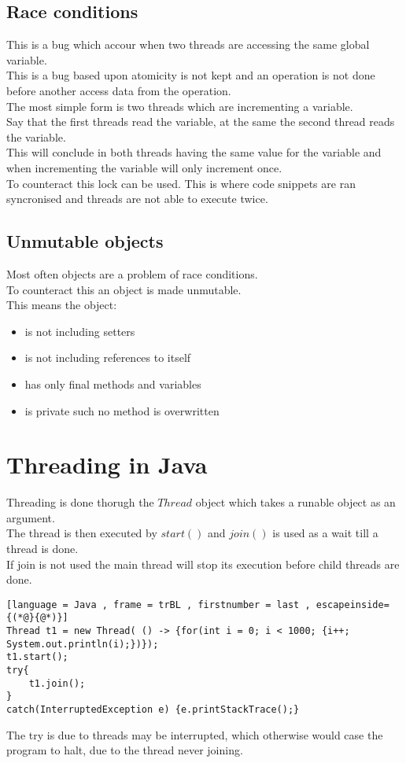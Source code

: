 \documentclass[12pt, a4paper]{article}
\begin{document}
	\subsection{Race conditions}
		This is a bug which accour when two threads are accessing the same global variable.\\
		This is a bug based upon atomicity is not kept and an operation is not done before another access data from the operation.\\
		The most simple form is two threads which are incrementing a variable.\\
		Say that the first threads read the variable, at the same the second thread reads the variable.\\
		This will conclude in both threads having the same value for the variable and when incrementing the variable will only increment once.\\
		To counteract this lock can be used. This is where code snippets are ran syncronised and threads are not able to execute twice.
	\subsection{Unmutable objects}
		Most often objects are a problem of race conditions.\\
		To counteract this an object is made unmutable.\\
		This means the object:
		\begin{itemize}
			\item is not including setters
			\item is not including references to itself
			\item has only final methods and variables
			\item is private such no method is overwritten
		\end{itemize}
\section{Threading in Java}
	Threading is done thorugh the $Thread$ object which takes a runable object as an argument.\\
	The thread is then executed by $start()$ and $join()$ is used as a wait till a thread is done.\\
	If join is not used the main thread will stop its execution before child threads are done.\\
\begin{lstlisting}[language = Java , frame = trBL , firstnumber = last , escapeinside={(*@}{@*)}]
Thread t1 = new Thread( () -> {for(int i = 0; i < 1000; {i++; System.out.println(i);})});
t1.start();
try{
	t1.join();
}
catch(InterruptedException e) {e.printStackTrace();}
\end{lstlisting}
	The try is due to threads may be interrupted, which otherwise would case the program to halt, due to the thread never joining.\\
\end{document}
